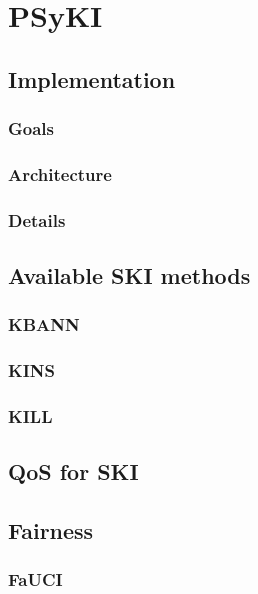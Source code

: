 
\chapter{\Acl{PSyKI}}
\label{ch:psyki}

\section{Implementation}\label{sec:implementation}

\subsection{Goals}\label{subsec:goals}

\subsection{Architecture}\label{subsec:architecture}

\subsection{Details}\label{subsec:details}

\section{Available \ac{SKI} methods}\label{sec:available-ski-methods}

\subsection{\Acl{KBANN}}\label{subsec:kbann}

\subsection{\Acl{KINS}}\label{subsec:kins}

\subsection{\Acl{KILL}}\label{subsec:kill}

\section{\Acl{QoS} for \ac{SKI}}\label{sec:qos}

\section{Fairness}\label{sec:fairness}

\subsection{\Acl{FaUCI}}\label{subsec:fauci}
